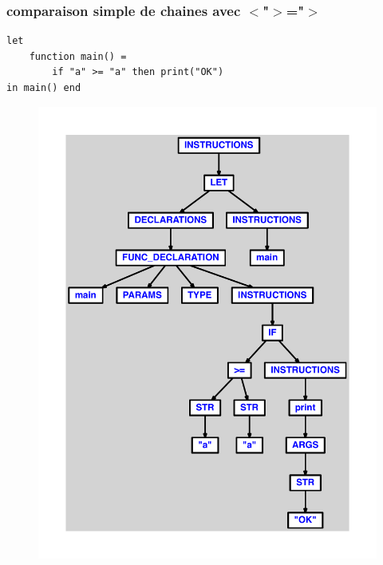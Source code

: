 \documentclass{article}
\begin{document}
\subsubsection{comparaison simple de chaines avec $ < $"$ > $="$ > $}
\begin{lstlisting}
let
	function main() =
		if "a" >= "a" then print("OK")
in main() end
\end{lstlisting}
\newpage
\begin{figure}[H]
\centering
\includegraphics[max width=\textwidth]{ast/ast_178.pdf}
\end{figure}
\newpage
\end{document}

